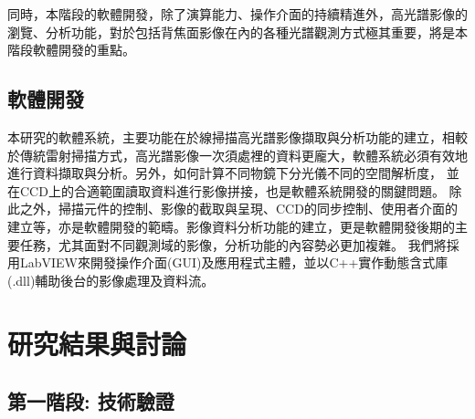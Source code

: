\documentclass[12pt]{article}
\begin{document}
同時，本階段的軟體開發，除了演算能力、操作介面的持續精進外，高光譜影像的瀏覽、分析功能，對於包括背焦面影像在內的各種光譜觀測方式極其重要，將是本階段軟體開發的重點。

\subsection{軟體開發} \label{software}
本研究的軟體系統，主要功能在於線掃描高光譜影像擷取與分析功能的建立，相較於傳統雷射掃描方式，高光譜影像一次須處裡的資料更龐大，軟體系統必須有效地進行資料擷取與分析。另外，如何計算不同物鏡下分光儀不同的空間解析度，
並在CCD上的合適範圍讀取資料進行影像拼接，也是軟體系統開發的關鍵問題。
除此之外，掃描元件的控制、影像的截取與呈現、CCD的同步控制、使用者介面的建立等，亦是軟體開發的範疇。影像資料分析功能的建立，更是軟體開發後期的主要任務，尤其面對不同觀測域的影像，分析功能的內容勢必更加複雜。
我們將採用LabVIEW來開發操作介面(GUI)及應用程式主體，並以C++實作動態含式庫(.dll)輔助後台的影像處理及資料流。

\section{研究結果與討論}
\subsection{第一階段: 技術驗證}
\end{document}
